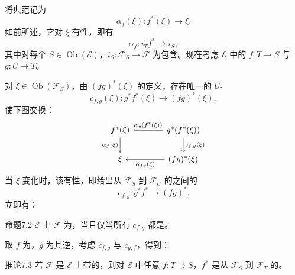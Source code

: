 将典范记为
\[
 \alpha_f(\xi):f^*(\xi)\longrightarrow\xi.
\]
如前所述，它对 $\xi$ 有性，即有
\[
 \alpha_f:i_Tf^*\longrightarrow i_S,
\]
其中对每个 $S\in\operatorname{Ob}(\mathcal E)$，$i_S:\mathcal F_S\to\mathcal F$ 为包含。现在考虑 $\mathcal E$ 中的 $f:T\to S$ 与 $g:U\to T$。

对 $\xi\in\operatorname{Ob}(\mathcal F_S)$，由 $(fg)^*(\xi)$ 的定义，存在唯一的 $U$-
\[
 c_{f,g}(\xi):g^*f^*(\xi)\longrightarrow(fg)^*(\xi),
\]
使下图交换：
\[
\begin{tikzcd}[column sep=large]
 f^*(\xi)\arrow[d,"\alpha_f(\xi)"']&g^*(f^*(\xi))\arrow[l,"\alpha_g(f^*(\xi))"']\arrow[d,"{c_{f,g}(\xi)}"]\\
 \xi&(fg)^*(\xi)\arrow[l,"\alpha_{fg}(\xi)"]
\end{tikzcd}
\]
当 $\xi$ 变化时，该有性，即给出从 $\mathcal F_S$ 到 $\mathcal F_U$ 的之间的
\[
 c_{f,g}:g^*f^*\longrightarrow(fg)^*.
\]
立即有：

\begin{SGAresult}{命题}{7.2}
$\mathcal E$ 上 $\mathcal F$ 为，当且仅当所有 $c_{f,g}$ 都是。
\end{SGAresult}
取 $f$ 为，$g$ 为其逆，考虑 $c_{f,g}$ 与 $c_{g,f}$，得到：

\begin{SGAresult}{推论}{7.3}
若 $\mathcal F$ 是 $\mathcal E$ 上带的，则对 $\mathcal E$ 中任意 $f:T\to S$，$f^*$ 是从 $\mathcal F_S$ 到 $\mathcal F_T$ 的。
\end{SGAresult}

